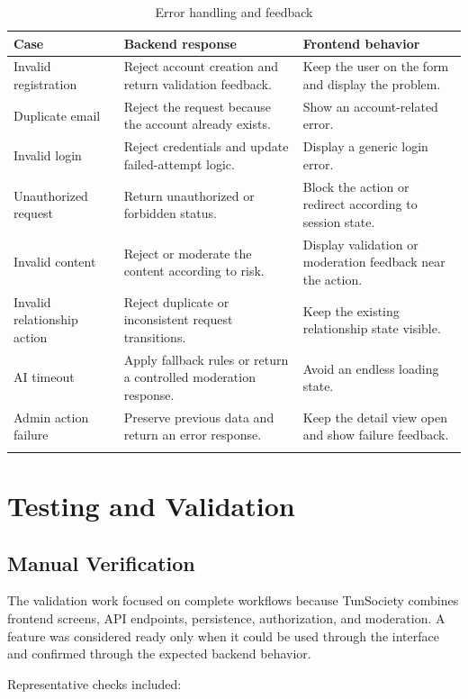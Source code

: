 \begin{longtable}{|m{3.4cm}|m{4.8cm}|m{5.8cm}|}
\hline
\textbf{Case} & \textbf{Backend response} & \textbf{Frontend behavior} \\
\hline
Invalid registration & Reject account creation and return validation feedback. & Keep the user on the form and display the problem. \\
\hline
Duplicate email & Reject the request because the account already exists. & Show an account-related error. \\
\hline
Invalid login & Reject credentials and update failed-attempt logic. & Display a generic login error. \\
\hline
Unauthorized request & Return unauthorized or forbidden status. & Block the action or redirect according to session state. \\
\hline
Invalid content & Reject or moderate the content according to risk. & Display validation or moderation feedback near the action. \\
\hline
Invalid relationship action & Reject duplicate or inconsistent request transitions. & Keep the existing relationship state visible. \\
\hline
AI timeout & Apply fallback rules or return a controlled moderation response. & Avoid an endless loading state. \\
\hline
Admin action failure & Preserve previous data and return an error response. & Keep the detail view open and show failure feedback. \\
\hline
\caption{Error handling and feedback}
\end{longtable}

\section{Testing and Validation}

\subsection{Manual Verification}

The validation work focused on complete workflows because TunSociety combines frontend screens, API endpoints, persistence, authorization, and moderation. A feature was considered ready only when it could be used through the interface and confirmed through the expected backend behavior.

Representative checks included:

